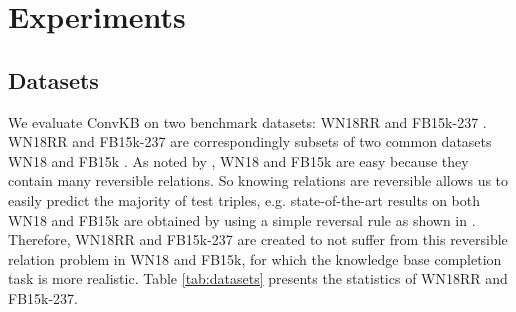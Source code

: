 \documentclass[11pt,a4paper]{article}
\begin{document}
\section{Experiments}

\subsection{Datasets}
We evaluate ConvKB on two benchmark datasets: WN18RR \citep{Dettmers2017} and FB15k-237 \citep{toutanova-chen:2015:CVSC}.
WN18RR and FB15k-237 are correspondingly subsets of two common datasets WN18 and FB15k \citep{NIPS2013_5071}.
As noted by \citet{toutanova-chen:2015:CVSC}, WN18 and FB15k are easy because they contain many reversible relations. So knowing relations are reversible allows us to easily predict the majority of test triples, e.g. state-of-the-art results on both WN18 and FB15k are obtained by using a simple reversal rule as shown in \citet{Dettmers2017}. 
Therefore, WN18RR and FB15k-237 are created to not suffer from this reversible relation problem in WN18 and FB15k, for which the knowledge base completion task is more realistic.  
Table \ref{tab:datasets} presents the statistics of WN18RR and FB15k-237.

\begin{table}[!t]
\centering
{}
\caption{Statistics of the experimental datasets.}
\label{tab:datasets}
\end{table}
\end{document}
